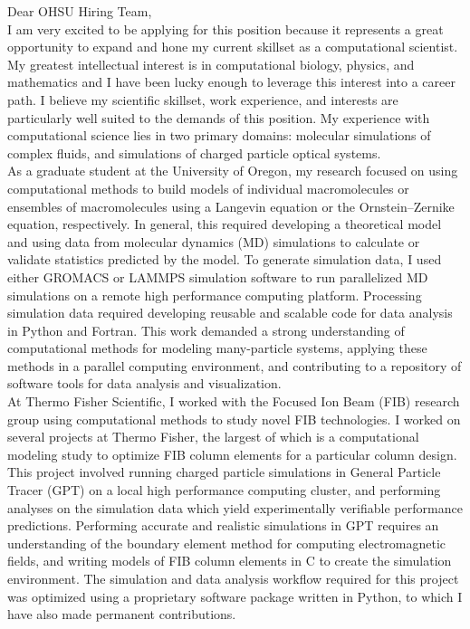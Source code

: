 \documentclass[]{letter}
\begin{document}

Dear OHSU Hiring Team, \\

I am very excited to be applying for this position because it represents a great opportunity to expand and hone my current skillset as a computational scientist. My greatest intellectual interest is in computational biology, physics, and mathematics and I have been lucky enough to leverage this interest into a career path. I believe my scientific skillset, work experience, and interests are particularly well suited to the demands of this position. My experience with computational science lies in two primary domains: molecular simulations of complex fluids, and simulations of charged particle optical systems. \\

As a graduate student at the University of Oregon, my research focused on using computational methods to build models of individual macromolecules or ensembles of macromolecules using a Langevin equation or the Ornstein–Zernike equation, respectively. In general, this required developing a theoretical model and using data from molecular dynamics (MD) simulations to calculate or validate statistics predicted by the model. To generate simulation data, I used either GROMACS or LAMMPS simulation software to run parallelized MD simulations on a remote high performance computing platform. Processing simulation data required developing reusable and scalable code for data analysis in Python and Fortran. This work demanded a strong understanding of computational methods for modeling many-particle systems, applying these methods in a parallel computing environment, and contributing to a repository of software tools for data analysis and visualization. \\

At Thermo Fisher Scientific, I worked with the Focused Ion Beam (FIB) research group using computational methods to study novel FIB technologies. I worked on several projects at Thermo Fisher, the largest of which is a computational modeling study to optimize FIB column elements for a particular column design. This project involved running charged particle simulations in General Particle Tracer (GPT) on a local high performance computing cluster, and performing analyses on the simulation data which yield experimentally verifiable performance predictions. Performing accurate and realistic simulations in GPT requires an understanding of the boundary element method for computing electromagnetic fields, and writing models of FIB column elements in C to create the simulation environment. The simulation and data analysis workflow required for this project was optimized using a proprietary software package written in Python, to which I have also made permanent contributions. \\
\end{document}
